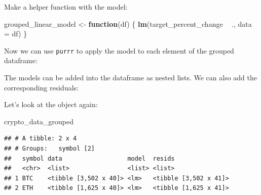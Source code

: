 \documentclass[
]{book}
\newenvironment{Shaded}{\begin{snugshade}}{\end{snugshade}}
\newcommand{\ControlFlowTok}[1]{\textcolor[rgb]{0.13,0.29,0.53}{\textbf{#1}}}
\newcommand{\DataTypeTok}[1]{\textcolor[rgb]{0.13,0.29,0.53}{#1}}
\newcommand{\KeywordTok}[1]{\textcolor[rgb]{0.13,0.29,0.53}{\textbf{#1}}}
\newcommand{\NormalTok}[1]{#1}
\newcommand{\OperatorTok}[1]{\textcolor[rgb]{0.81,0.36,0.00}{\textbf{#1}}}
\newcommand{\StringTok}[1]{\textcolor[rgb]{0.31,0.60,0.02}{#1}}
\begin{document}
Make a helper function with the model:

\begin{Shaded}
\begin{Highlighting}[]
\NormalTok{grouped_linear_model <-}\StringTok{ }\ControlFlowTok{function}\NormalTok{(df) \{}
  \KeywordTok{lm}\NormalTok{(target_percent_change }\OperatorTok{~}\StringTok{ }\NormalTok{., }\DataTypeTok{data =}\NormalTok{ df)}
\NormalTok{\}}
\end{Highlighting}
\end{Shaded}

Now we can use \texttt{purrr}\citep{R-purrr} to apply the model to each element of the grouped dataframe:

\begin{Shaded}
\end{Shaded}

The models can be added into the dataframe as nested lists. We can also add the corresponding residuals:

\begin{Shaded}
\end{Shaded}

Let's look at the object again:

\begin{Shaded}
\begin{Highlighting}[]
\NormalTok{crypto_data_grouped}
\end{Highlighting}
\end{Shaded}

\begin{verbatim}
## # A tibble: 2 x 4
## # Groups:   symbol [2]
##   symbol data                  model  resids               
##   <chr>  <list>                <list> <list>               
## 1 BTC    <tibble [3,502 x 40]> <lm>   <tibble [3,502 x 41]>
## 2 ETH    <tibble [1,625 x 40]> <lm>   <tibble [1,625 x 41]>
\end{verbatim}
\end{document}
